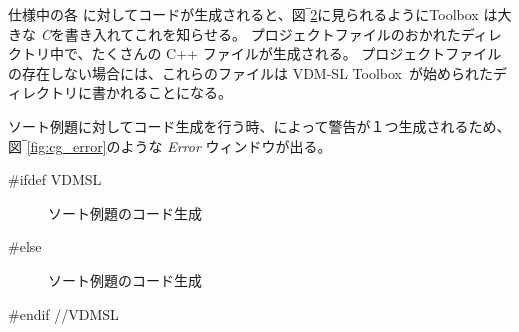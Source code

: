 \documentclass[\pformat,12pt]{jarticle}
\newcommand{\ToolboxName}{VDM-SL Toolbox}
\newcommand{\ToolboxName}{VDM++ Toolbox}
\begin{document}
仕様中の各  に対してコードが生成されると、図‾\ref{fig:cg2}に見られるようにToolbox は大きな {\em \large{C}}を書き入れてこれを知らせる。
プロジェクトファイルのおかれたディレクトリ中で、たくさんの C++ ファイルが生成される。
プロジェクトファイルの存在しない場合には、これらのファイルは \ToolboxName\ が始められたディレクトリに書かれることになる。

ソート例題に対してコード生成を行う時、\tcg{}によって警告が１つ生成されるため、図‾\ref{fig:cg_error}のような {\em Error} ウィンドウが出る。

#ifdef VDMSL
\begin{figure}[tbh]
\begin{center}
\mbox{}
\caption{ソート例題のコード生成}\label{fig:cg2}
\end{center}
\end{figure}
#else
\begin{figure}[tbh]
\begin{center}
\mbox{}
\caption{ソート例題のコード生成}\label{fig:cg2}
\end{center}
\end{figure}
#endif //VDMSL
\end{document}
